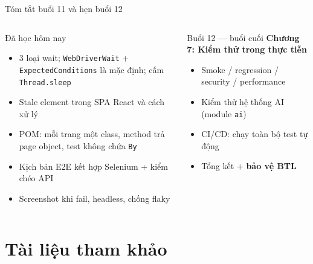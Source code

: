 \documentclass[aspectratio=169,12pt]{beamer}
\begin{document}
\begin{frame}{Tóm tắt buổi 11 và hẹn buổi 12}
  \begin{columns}[T]
    \begin{block}{Đã học hôm nay}
      \begin{itemize}
        \item 3 loại wait; \texttt{WebDriverWait} +
              \texttt{ExpectedConditions} là mặc định;
              cấm \texttt{Thread.sleep}
        \item Stale element trong SPA React và cách xử lý
        \item POM: mỗi trang một class, method trả page object,
              test không chứa \texttt{By}
        \item Kịch bản E2E kết hợp Selenium + kiểm chéo API
        \item Screenshot khi fail, headless, chống flaky
      \end{itemize}
    \end{block}

    \begin{block}{Buổi 12 --- buổi cuối}
      \textbf{Chương 7: Kiểm thử trong thực tiễn}
      \begin{itemize}
        \item Smoke / regression / security / performance
        \item Kiểm thử hệ thống AI (module \texttt{ai})
        \item CI/CD: chạy toàn bộ test tự động
        \item Tổng kết + \textbf{bảo vệ BTL}
      \end{itemize}
    \end{block}
  \end{columns}
\end{frame}

\section{Tài liệu tham khảo}
\end{document}
